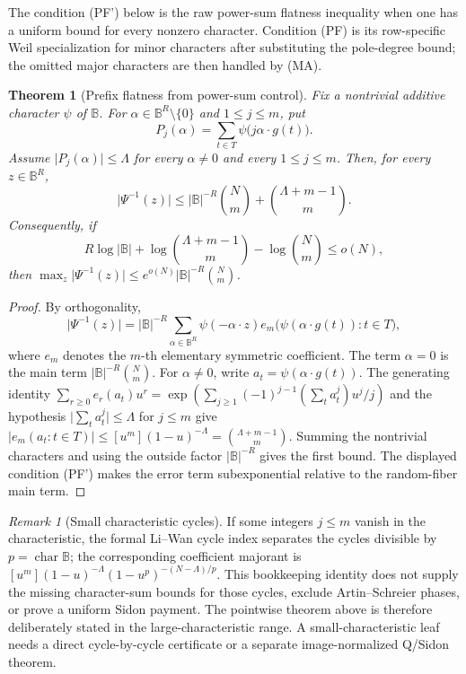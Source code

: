 \documentclass[12pt,a4paper]{amsart}
\numberwithin{equation}{section}
\newtheorem{theorem}{Theorem}[section]
\theoremstyle{remark}
\newtheorem{remark}[remark]{Remark}
\newcommand{\B}{\mathbb B}
\newcommand{\abs}[1]{\lvert #1\rvert}
\begin{document}
The condition \textup{(PF')} below is the raw power-sum flatness
inequality when one has a uniform bound for every nonzero character.
Condition \textup{(PF)} is its row-specific Weil specialization for minor
characters after substituting the pole-degree bound; the omitted major
characters are then handled by \textup{(MA)}.

\begin{theorem}[Prefix flatness from power-sum control]\label{thm:prefix-flatness-power-sum}
Fix a nontrivial additive character \(\psi\) of \(\B\).  For \(\alpha\in\B^R\setminus\{0\}\) and \(1\le j\le m\), put
\[
        P_j(\alpha)=\sum_{t\in T}\psi\bigl(j\alpha\cdot g(t)\bigr).
\]
Assume \(\abs{P_j(\alpha)}\le \Lambda\) for every \(\alpha\ne0\) and every \(1\le j\le m\).  Then, for every \(z\in\B^R\),
\[
        \abs{\Psi^{-1}(z)}
        \le \abs\B^{-R}\binom Nm+\binom{\Lambda+m-1}{m}.
\]
Consequently, if
\[
        \tag{PF'}
        R\log\abs\B+\log\binom{\Lambda+m-1}{m}-\log\binom Nm\le o(N),
\]
then \(\max_z\abs{\Psi^{-1}(z)}\le e^{o(N)}\abs\B^{-R}\binom Nm\).
\end{theorem}

\begin{proof}
By orthogonality,
\[
        \abs{\Psi^{-1}(z)}=\abs\B^{-R}
        \sum_{\alpha\in\B^R}\psi(-\alpha\cdot z)
        e_m\bigl(\psi(\alpha\cdot g(t)):t\in T\bigr),
\]
where \(e_m\) denotes the \(m\)-th elementary symmetric coefficient.  The term \(\alpha=0\) is the main term \(\abs\B^{-R}\binom Nm\).  For \(\alpha\ne0\), write \(a_t=\psi(\alpha\cdot g(t))\).  The generating identity
\(\sum_{r\ge0}e_r(a_t)u^r=\exp(\sum_{j\ge1}(-1)^{j-1}(\sum_ta_t^j)u^j/j)\) and the hypothesis \(\abs{\sum_ta_t^j}\le\Lambda\) for \(j\le m\) give
\(\abs{e_m(a_t:t\in T)}\le[u^m](1-u)^{-\Lambda}=\binom{\Lambda+m-1}{m}\).  Summing the nontrivial characters and using the outside factor \(\abs\B^{-R}\) gives the first bound.  The displayed condition \textup{(PF')} makes the error term subexponential relative to the random-fiber main term.
\end{proof}

\begin{remark}[Small characteristic cycles]\label{rem:small-characteristic-cycles}
If some integers \(j\le m\) vanish in the characteristic, the formal
Li--Wan cycle index separates the cycles divisible by
\(p=\operatorname{char}\B\); the corresponding coefficient majorant is
\([u^m](1-u)^{-\Lambda}(1-u^p)^{-(N-\Lambda)/p}\).  This bookkeeping
identity does not supply the missing character-sum bounds for those
cycles, exclude Artin--Schreier phases, or prove a uniform Sidon payment.
The pointwise theorem above is therefore deliberately stated in the
large-characteristic range.  A small-characteristic leaf needs a direct
cycle-by-cycle certificate or a separate image-normalized Q/Sidon theorem.
\end{remark}
\end{document}
